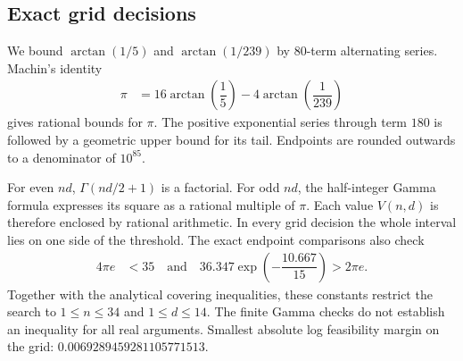 \documentclass[12pt]{amsart}
\theoremstyle{remark}
\theoremstyle{definition}
\numberwithin{equation}{section}
\begin{document}
\subsection*{Exact grid decisions}
We bound $\arctan(1/5)$ and $\arctan(1/239)$ by 80-term alternating series.
Machin's identity
\begin{align*}
  \pi&=16\arctan\!\left(\dfrac{1}{5}\right)
       -4\arctan\!\left(\dfrac{1}{239}\right)
\end{align*}
gives rational bounds for $\pi$. The positive exponential series through
term $180$ is followed by a geometric upper bound for its tail. Endpoints
are rounded outwards to a denominator of $10^{85}$.

For even $nd$, $\Gamma(nd/2+1)$ is a factorial. For odd $nd$, the
half-integer Gamma formula expresses its square as a rational multiple of
$\pi$. Each value $V(n,d)$ is therefore enclosed by rational arithmetic.
In every grid decision the whole interval lies on one side of the threshold.
The exact endpoint comparisons also check
\begin{align*}
  4\pi e&<35
  \quad\text{and}\quad
  36.347\exp\!\left(-\dfrac{10.667}{15}\right)>2\pi e.
\end{align*}
Together with the analytical covering inequalities, these constants
restrict the search to $1\leq n\leq 34$ and $1\leq d\leq 14$. The finite
Gamma checks do not establish an inequality for all real arguments.
Smallest absolute log feasibility margin on the grid: $0.0069289459281105771513$.

\clearpage
\setcounter{table}{0}
\renewcommand{\thetable}{S\arabic{table}}
\renewcommand{\theHtable}{S\arabic{table}}
\end{document}
